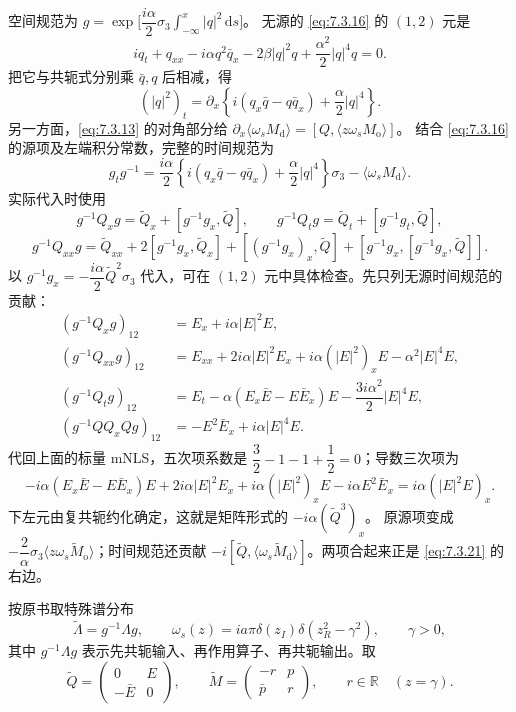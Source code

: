 \documentclass[lang=cn,scheme=chinese,mode=simple,device=normal,color=blue,math=cm,thmcnt=section,12pt]{elegantbook}
\newcommand{\dd}{\,\mathrm{d}}
\newcommand{\eqq}[2]{\tag{#1}\label{eq:#1}#2}
\begin{document}
\begin{callout}[计算：规范变换中时间项及源项的来由]
空间规范为
$g=\exp\bigl[\dfrac{i\alpha}{2}\sigma_3\displaystyle\int_{-\infty}^x|q|^2\dd s\bigr]$。
无源的 \eqref{eq:7.3.16} 的 $(1,2)$ 元是
\[
iq_t+q_{xx}-i\alpha q^2\bar q_x-2\beta|q|^2q+\dfrac{\alpha^2}{2}|q|^4q=0.
\]
把它与共轭式分别乘 $\bar q,q$ 后相减，得
\[
(|q|^2)_t=\partial_x\left\{i(q_x\bar q-q\bar q_x)+\dfrac{\alpha}{2}|q|^4\right\}.
\]
另一方面，\eqref{eq:7.3.13} 的对角部分给
$\partial_x\langle\omega_sM_{\mathrm d}\rangle=[Q,\langle z\omega_sM_{\mathrm o}\rangle]$。
结合 \eqref{eq:7.3.16} 的源项及左端积分常数，完整的时间规范为
\[
g_tg^{-1}=\dfrac{i\alpha}{2}\left\{i(q_x\bar q-q\bar q_x)+\dfrac{\alpha}{2}|q|^4\right\}\sigma_3
-\langle\omega_sM_{\mathrm d}\rangle.
\]
实际代入时使用
\[
g^{-1}Q_xg=\widetilde Q_x+[g^{-1}g_x,\widetilde Q],\qquad
g^{-1}Q_tg=\widetilde Q_t+[g^{-1}g_t,\widetilde Q],
\]
\[
g^{-1}Q_{xx}g=\widetilde Q_{xx}+2[g^{-1}g_x,\widetilde Q_x]
+[(g^{-1}g_x)_x,\widetilde Q]+[g^{-1}g_x,[g^{-1}g_x,\widetilde Q]].
\]
以 $g^{-1}g_x=-\dfrac{i\alpha}{2}\widetilde Q^2\sigma_3$ 代入，可在 $(1,2)$ 元中具体检查。先只列无源时间规范的贡献：
\[
\begin{aligned}
(g^{-1}Q_xg)_{12}&=E_x+i\alpha|E|^2E,\\
(g^{-1}Q_{xx}g)_{12}&=E_{xx}+2i\alpha|E|^2E_x+i\alpha(|E|^2)_xE-\alpha^2|E|^4E,\\
(g^{-1}Q_tg)_{12}&=E_t-\alpha(E_x\bar E-E\bar E_x)E-\dfrac{3i\alpha^2}{2}|E|^4E,\\
(g^{-1}QQ_xQg)_{12}&=-E^2\bar E_x+i\alpha|E|^4E.
\end{aligned}
\]
代回上面的标量 mNLS，五次项系数是
$\dfrac{3}{2}-1-1+\dfrac{1}{2}=0$；导数三次项为
\[
-i\alpha(E_x\bar E-E\bar E_x)E+2i\alpha|E|^2E_x+i\alpha(|E|^2)_xE-i\alpha E^2\bar E_x
=i\alpha(|E|^2E)_x.
\]
下左元由复共轭约化确定，这就是矩阵形式的 $-i\alpha(\widetilde Q^3)_x$。
原源项变成 $-\dfrac{2}{\alpha}\sigma_3\langle z\omega_s\widetilde M_{\mathrm o}\rangle$；时间规范还贡献
$-i[\widetilde Q,\langle\omega_s\widetilde M_{\mathrm d}\rangle]$。两项合起来正是 \eqref{eq:7.3.21} 的右边。
\end{callout}
按原书取特殊谱分布
\begin{equation}
\eqq{7.3.22}{\widetilde\Lambda=g^{-1}\Lambda g,\qquad
\omega_s(z)=ia\pi\delta(z_I)\delta(z_R^2-\gamma^2),\qquad \gamma>0,}
\end{equation}
其中 $g^{-1}\Lambda g$ 表示先共轭输入、再作用算子、再共轭输出。取
\begin{equation}
\eqq{7.3.23}{\widetilde Q=\begin{pmatrix}0&E\\-\bar E&0\end{pmatrix},\qquad
\widetilde M=\begin{pmatrix}-r&p\\\bar p&r\end{pmatrix},\qquad r\in\mathbb R
\quad(z=\gamma).}
\end{equation}
\end{document}
